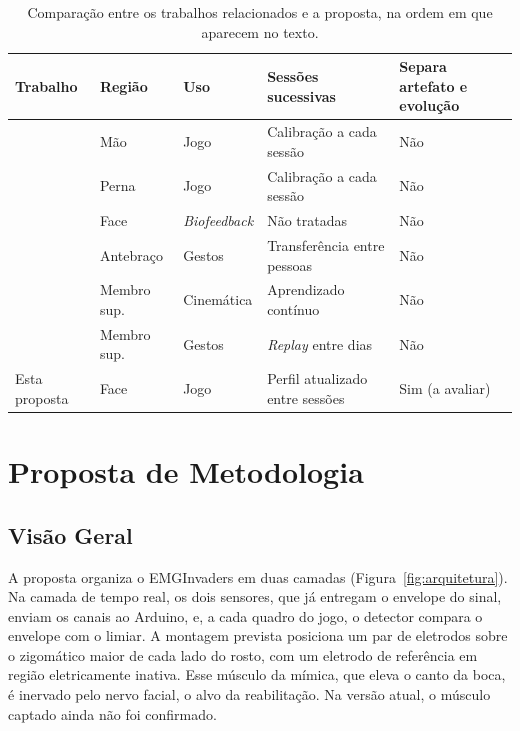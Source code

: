 \documentclass[runningheads]{llncs}
\begin{document}
\begin{table}[htb]
\centering
\caption{Comparação entre os trabalhos relacionados e a proposta, na ordem em que aparecem no texto.}
\label{tab:relacionados}
\scriptsize
\begin{tabularx}{\textwidth}{@{}L{3.1cm}L{1.7cm}L{1.55cm}XL{1.45cm}@{}}
\toprule
\textbf{Trabalho} & \textbf{Região} & \textbf{Uso} & \textbf{Sessões sucessivas} & \textbf{Separa artefato e evolução} \\
\midrule
\citet{seo2022emg} & Mão & Jogo & Calibração a cada sessão & Não \\
\citet{boulay2024serious} & Perna & Jogo & Calibração a cada sessão & Não \\
\citet{machetanz2022facial} & Face & \textit{Biofeedback} & Não tratadas & Não \\
\citet{coteallard2019transfer} & Antebraço & Gestos & Transferência entre pessoas & Não \\
\citet{chen2024lifelong} & Membro sup. & Cinemática & Aprendizado contínuo & Não \\
\citet{zhang2024replay} & Membro sup. & Gestos & \textit{Replay} entre dias & Não \\
\midrule
Esta proposta & Face & Jogo & Perfil atualizado entre sessões & Sim (a avaliar) \\
\bottomrule
\end{tabularx}
\end{table}

\section{Proposta de Metodologia}\label{sec:metodologia}

\subsection{Visão Geral}

A proposta organiza o EMGInvaders em duas camadas (Figura~\ref{fig:arquitetura}). Na camada de tempo real, os dois sensores, que já entregam o envelope do sinal, enviam os canais ao Arduino, e, a cada quadro do jogo, o detector compara o envelope com o limiar. A montagem prevista posiciona um par de eletrodos sobre o zigomático maior de cada lado do rosto, com um eletrodo de referência em região eletricamente inativa. Esse músculo da mímica, que eleva o canto da boca, é inervado pelo nervo facial, o alvo da reabilitação. Na versão atual, o músculo captado ainda não foi confirmado.
\end{document}

